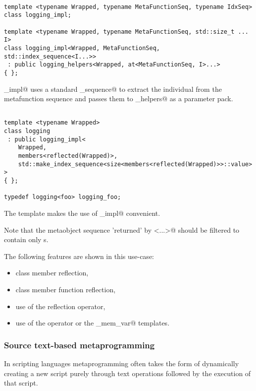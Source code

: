 \begin{verbatim}

template <typename Wrapped, typename MetaFunctionSeq, typename IdxSeq>
class logging_impl;

template <typename Wrapped, typename MetaFunctionSeq, std::size_t ... I>
class logging_impl<Wrapped, MetaFunctionSeq, std::index_sequence<I...>>
 : public logging_helpers<Wrapped, at<MetaFunctionSeq, I>...>
{ };

\end{verbatim}

\verb@logging_impl@ uses a standard \verb@index_sequence@ to extract the
individual  from the metafunction sequence and passes them
to \verb@logging_helpers@ as a parameter pack.


\begin{verbatim}

template <typename Wrapped>
class logging
 : public logging_impl<
	Wrapped,
	members<reflected(Wrapped)>,
	std::make_index_sequence<size<members<reflected(Wrapped)>>::value>
>
{ };

typedef logging<foo> logging_foo;

\end{verbatim}

The \verb@logging@ template makes the use of \verb@logging_impl@ convenient.

Note that the metaobject sequence 'returned' by \verb@members<...>@ should
be filtered to contain only s.

The following features are shown in this use-case:

\begin{itemize}
\item{class member reflection,}
\item{class member function reflection,}
\item{use of the reflection operator,}
\item{use of the \verb@identifier@ operator or the \verb@named_mem_var@ templates.}
\end{itemize}

\subsubsection{Source text-based metaprogramming}

In scripting languages metaprogramming often takes the form of dynamically creating
a new script purely through text operations followed by the execution of that script.

